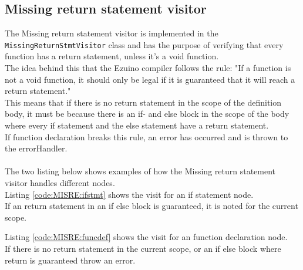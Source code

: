 \subsection{Missing return statement visitor}
The Missing return statement visitor is implemented in the \texttt{MissingReturnStmtVisitor} class and has the purpose of verifying that every function has a return statement, unless it's a void function.\\
The idea behind this that the Ezuino compiler follows the rule: "If a function is not a void function, it should only be legal if it is guaranteed that it will reach a return statement."\\
This means that if there is no return statement in the scope of the definition body, it must be because there is an if- and else block in the scope of the body where every if statement and the else statement have a return statement.\\
If function declaration breaks this rule, an error has occurred and is thrown to the errorHandler.
\\\\
The two listing below shows examples of how the Missing return statement visitor handles different nodes.\\
Listing \ref{code:MISRE:ifstmt} shows the visit for an if statement node.\\
If an return statement in an if else block is guaranteed, it is noted for the current scope.

\noindent\newline
Listing \ref{code:MISRE:funcdef} shows the visit for an function declaration node.\\
If there is no return statement in the current scope, or an if else block where return is guaranteed throw an error.

\noindent\newline
